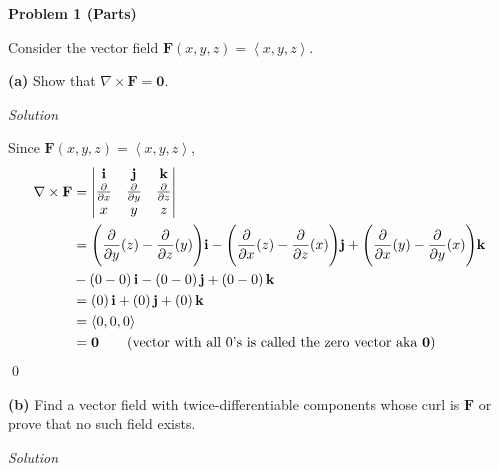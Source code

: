 \documentclass{article}
\newcommand{\lrp}[1]{\left( #1 \right)}
\newcommand{\lra}[1]{\left\langle #1 \right\rangle}
\renewcommand{\i}[0]{\mathbf{i}}
\renewcommand{\j}[0]{\mathbf{j}}
\renewcommand{\k}[0]{\mathbf{k}}
\newcommand{\F}[0]{\mathbf{F}}
\newcommand{\Solution}{\textit{Solution}}
\begin{document}
{}\textbf{Problem 1 (Parts)}

Consider the vector field $\F(x,y,z)=\lra{x,y,z}$.

{}\textbf{(a)} Show that $\nabla \times \F=\mathbf{0}$.


\Solution

Since $\F(x,y,z)=\lra{x,y,z}$,
\begin{align*}
    \nabla \times \F&=\begin{vmatrix}\i & \j & \k\\ \frac{\partial}{\partial x} & \frac{\partial}{\partial y}& \frac{\partial}{\partial z}\\ x & y & z\end{vmatrix}\\
    &=\Bigg(\frac{\partial }{\partial y}(z)-\frac{\partial }{\partial z}(y)\Bigg)\i-\Bigg(\frac{\partial}{\partial x}(z)-\frac{\partial}{\partial z}(x)\Bigg)\j+\Bigg(\frac{\partial}{\partial x}(y)-\frac{\partial}{\partial y}(x)\Bigg)\k\\
    &-\lrp{0-0}\i-\lrp{0-0}\j+\lrp{0-0}\k\\
    &=\lrp{0}\i+\lrp{0}\j+\lrp{0}\k\\
    &=\lra{0,0,0}\\
    &=\mathbf{0}\tag{vector with all $0$'s is called the zero vector aka $\mathbf{0}$}
\end{align*}
\qed

{}\textbf{(b)} Find a vector field with twice-differentiable components whose curl is $\F$ or prove that no such field exists.

\Solution
\end{document}
